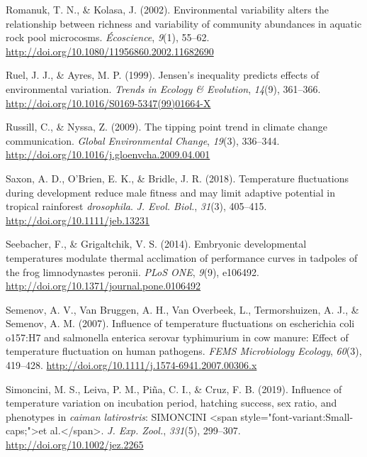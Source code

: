 \documentclass[12pt,twoside]{reedthesis}
\begin{document}
\leavevmode\hypertarget{ref-romanuk_environmental_2002}{}%
Romanuk, T. N., \& Kolasa, J. (2002). Environmental variability alters the relationship between richness and variability of community abundances in aquatic rock pool microcosms. \emph{Écoscience}, \emph{9}(1), 55--62. \url{http://doi.org/10.1080/11956860.2002.11682690}

\leavevmode\hypertarget{ref-ruel_jensens_1999}{}%
Ruel, J. J., \& Ayres, M. P. (1999). Jensen's inequality predicts effects of environmental variation. \emph{Trends in Ecology \& Evolution}, \emph{14}(9), 361--366. \url{http://doi.org/10.1016/S0169-5347(99)01664-X}

\leavevmode\hypertarget{ref-russill_tipping_2009}{}%
Russill, C., \& Nyssa, Z. (2009). The tipping point trend in climate change communication. \emph{Global Environmental Change}, \emph{19}(3), 336--344. \url{http://doi.org/10.1016/j.gloenvcha.2009.04.001}

\leavevmode\hypertarget{ref-saxon_temperature_2018-1}{}%
Saxon, A. D., O'Brien, E. K., \& Bridle, J. R. (2018). Temperature fluctuations during development reduce male fitness and may limit adaptive potential in tropical rainforest \emph{drosophila}. \emph{J. Evol. Biol.}, \emph{31}(3), 405--415. \url{http://doi.org/10.1111/jeb.13231}

\leavevmode\hypertarget{ref-seebacher_embryonic_2014}{}%
Seebacher, F., \& Grigaltchik, V. S. (2014). Embryonic developmental temperatures modulate thermal acclimation of performance curves in tadpoles of the frog limnodynastes peronii. \emph{PLoS ONE}, \emph{9}(9), e106492. \url{http://doi.org/10.1371/journal.pone.0106492}

\leavevmode\hypertarget{ref-semenov_influence_2007}{}%
Semenov, A. V., Van Bruggen, A. H., Van Overbeek, L., Termorshuizen, A. J., \& Semenov, A. M. (2007). Influence of temperature fluctuations on escherichia coli o157:H7 and salmonella enterica serovar typhimurium in cow manure: Effect of temperature fluctuation on human pathogens. \emph{FEMS Microbiology Ecology}, \emph{60}(3), 419--428. \url{http://doi.org/10.1111/j.1574-6941.2007.00306.x}

\leavevmode\hypertarget{ref-simoncini_influence_2019}{}%
Simoncini, M. S., Leiva, P. M., Piña, C. I., \& Cruz, F. B. (2019). Influence of temperature variation on incubation period, hatching success, sex ratio, and phenotypes in \emph{caiman latirostris}: SIMONCINI \textless{}span style="font-variant:Small-caps;"\textgreater{}et al.\textless{}/span\textgreater{}. \emph{J. Exp. Zool.}, \emph{331}(5), 299--307. \url{http://doi.org/10.1002/jez.2265}
\end{document}
